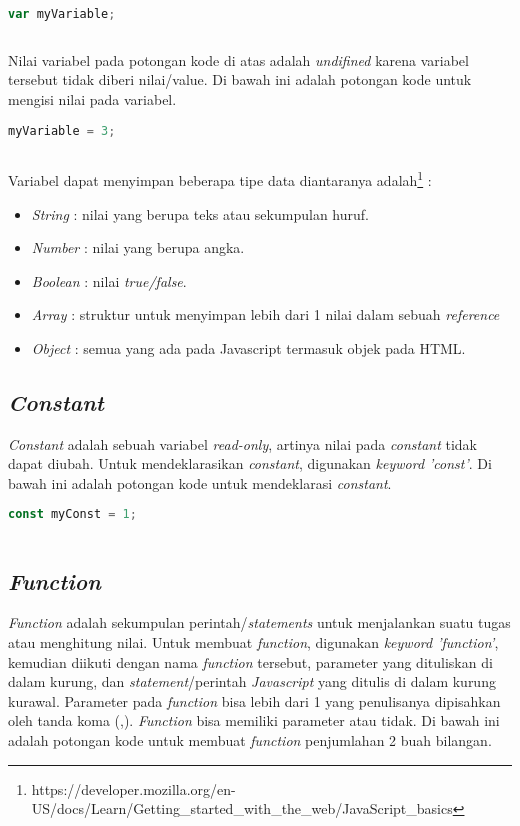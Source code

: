\begin{lstlisting}[language=Javascript, caption=Deklarasi variabel]
	var myVariable;
	
\end{lstlisting}

Nilai variabel pada potongan kode di atas adalah \textit{undifined} karena variabel tersebut tidak diberi nilai/value. Di bawah ini adalah potongan kode untuk mengisi nilai pada variabel. 

\begin{lstlisting}[language=Javascript, caption=Mengisi nilai sebuah variabel]
	myVariable = 3;	
	
\end{lstlisting}

Variabel dapat menyimpan beberapa tipe data diantaranya adalah\footnote{https://developer.mozilla.org/en-US/docs/Learn/Getting\_started\_with\_the\_web/JavaScript\_basics} :
\begin{itemize}
	\item \textit{String} : nilai yang berupa teks atau sekumpulan huruf.
	\item \textit{Number} : nilai yang berupa angka.
	\item \textit{Boolean} : nilai \textit{true/false}.
	\item \textit{Array} : struktur untuk menyimpan lebih dari 1 nilai dalam sebuah \textit{reference}
	\item \textit{Object} : semua yang ada pada Javascript termasuk objek pada HTML.
\end{itemize}

\subsection{\textit{Constant}}
\textit{Constant} adalah sebuah variabel \textit{read-only}, artinya nilai pada \textit{constant} tidak dapat diubah. Untuk mendeklarasikan \textit{constant}, digunakan \textit{keyword 'const'}. Di bawah ini adalah potongan kode untuk mendeklarasi \textit{constant}.

\begin{lstlisting}[language=Javascript, caption=Deklarasi \textit{constant}]
	const myConst = 1;
	
\end{lstlisting}

\subsection{\textit{Function}}
\textit{Function} adalah sekumpulan perintah/\textit{statements} untuk menjalankan suatu tugas atau menghitung nilai. Untuk membuat \textit{function}, digunakan \textit{keyword 'function'}, kemudian diikuti dengan nama \textit{function} tersebut, parameter yang dituliskan di dalam kurung, dan \textit{statement}/perintah \textit{Javascript} yang ditulis di dalam kurung kurawal. Parameter pada \textit{function} bisa lebih dari 1 yang penulisanya dipisahkan oleh tanda koma (,). \textit{Function} bisa memiliki parameter atau tidak. Di bawah ini adalah potongan kode untuk membuat \textit{function} penjumlahan 2 buah bilangan.


